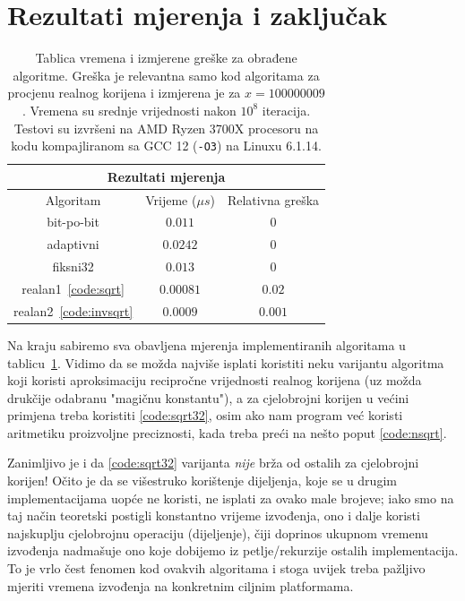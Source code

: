 \documentclass[12pt]{scrartcl}
\begin{document}
\section{Rezultati mjerenja i zaključak}
\begin{table}[t]
    \center
    
    \begin{tabular}{|c|c|c|}
    \hline
    \multicolumn{3}{|c|}{\textbf{Rezultati mjerenja}}\\ \hline
    Algoritam & Vrijeme ($\mu s$) & Relativna greška \\ \hline\hline
    bit-po-bit & $0.011$ & $0$ \\ \hline
    adaptivni & $0.0242$ & $0$ \\ \hline
    fiksni32 & $0.013$ & $0$ \\ \hline
    realan1~\eqref{code:sqrt} & $0.00081$ & $0.02$ \\ \hline
    realan2~\eqref{code:invsqrt} & $0.0009$ & $0.001$ \\ \hline
    \end{tabular}
    \caption{Tablica vremena i izmjerene greške za obrađene algoritme. Greška je relevantna samo kod algoritama za procjenu realnog korijena i izmjerena
    je za $x=100000009$. Vremena su srednje vrijednosti nakon $10^8$ iteracija. Testovi su izvršeni na AMD Ryzen 3700X procesoru na kodu kompajliranom
    sa GCC 12 (\texttt{-O3}) na Linuxu 6.1.14.}\label{tbl}
\end{table}
Na kraju sabiremo sva obavljena mjerenja implementiranih algoritama u tablicu~\ref{tbl}. Vidimo da se možda najviše isplati koristiti neku varijantu
algoritma koji koristi aproksimaciju recipročne vrijednosti realnog korijena (uz možda drukčije odabranu "magičnu konstantu"), a za cjelobrojni
korijen u većini primjena treba koristiti \autoref{code:sqrt32}, osim ako nam program već koristi aritmetiku proizvoljne preciznosti, kada
treba preći na nešto poput \autoref{code:nsqrt}.

Zanimljivo je i da \autoref{code:sqrt32} varijanta \emph{nije} brža od ostalih za cjelobrojni korijen! Očito je da se višestruko korištenje dijeljenja, koje se 
u drugim implementacijama uopće ne koristi, ne isplati za ovako male brojeve; iako smo na taj način teoretski postigli konstantno vrijeme izvođenja,
ono i dalje koristi najskuplju cjelobrojnu operaciju (dijeljenje), čiji doprinos ukupnom vremenu izvođenja nadmašuje ono koje dobijemo iz petlje/rekurzije
ostalih implementacija. To je vrlo čest fenomen kod ovakvih algoritama i stoga uvijek treba pažljivo mjeriti vremena izvođenja na konkretnim ciljnim
platformama.
\end{document}
